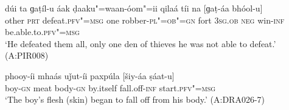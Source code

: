 \begin{exe}
\ex
\label{ex:9-77}
\gll dúi ta ɡaṭíl-u áak ḍaaku"=waan-óom"=ii qilaá tíi na [ɡaṭ-áa bhóol-u]  \\
other \textsc{prt} defeat.\textsc{pfv"=msg} one robber-\textsc{pl"=ob"=gn}  fort \textsc{3sg.ob} \textsc{neg} win-\textsc{inf} be.able.to.\textsc{pfv"=msg} \\
\glt `He defeated them all, only one den of thieves he was not able to defeat.' (A:PIR008)

\ex
\label{ex:9-78}
\gll phooy-íi mhaás uǰut-íi paxpúla [šiy-áa ṣáat-u] \\
boy-\textsc{gn} meat body-\textsc{gn} by.itself fall.off-\textsc{inf} start.\textsc{pfv"=msg} \\
\glt `The boy's flesh (skin) began to fall off from his body.' (A:DRA026-7) 
\end{exe}